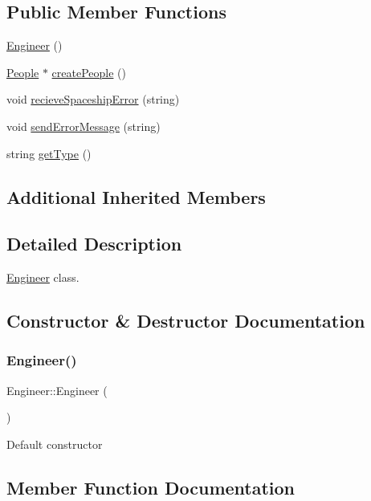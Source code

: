 \subsection*{Public Member Functions}
\begin{DoxyCompactItemize}
\item 
\hyperlink{classEngineer_acf0604e3e44a09583b420c729b651ad7}{Engineer} ()
\item 
\hyperlink{classPeople}{People} $\ast$ \hyperlink{classEngineer_aaa9d760e22cab80ec283b2a085782feb}{create\+People} ()
\item 
void \hyperlink{classEngineer_acc86ce6b4b1388be8ebacc685f9e6233}{recieve\+Spaceship\+Error} (string)
\item 
void \hyperlink{classEngineer_ae60806f33b7f226891dbb7ad9b8a0c0b}{send\+Error\+Message} (string)
\item 
string \hyperlink{classEngineer_ae2f83b9c2df3e8d3937697b23546571a}{get\+Type} ()
\end{DoxyCompactItemize}
\subsection*{Additional Inherited Members}


\subsection{Detailed Description}
\hyperlink{classEngineer}{Engineer} class. 

\subsection{Constructor \& Destructor Documentation}
\mbox{\label{classEngineer_acf0604e3e44a09583b420c729b651ad7}} 
\subsubsection{\texorpdfstring{Engineer()}{Engineer()}}
{\footnotesize\ttfamily Engineer\+::\+Engineer (\begin{DoxyParamCaption}{ }\end{DoxyParamCaption})\hspace{0.3cm}{\ttfamily [inline]}}

Default constructor 

\subsection{Member Function Documentation}
\mbox{\label{classEngineer_aaa9d760e22cab80ec283b2a085782feb}} 
